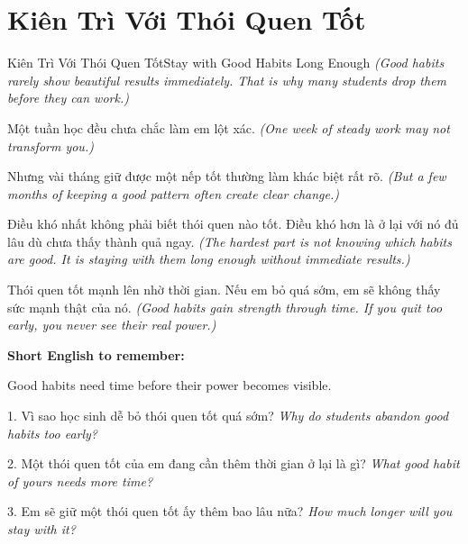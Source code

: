 \section{Kiên Trì Với Thói Quen Tốt}
\begin{truyen}{Kiên Trì Với Thói Quen Tốt}{Stay with Good Habits Long Enough}
\textit{(Good habits rarely show beautiful results immediately. That is why many students drop them before they can work.)}

Một tuần học đều chưa chắc làm em lột xác.
\textit{(One week of steady work may not transform you.)}

Nhưng vài tháng giữ được một nếp tốt thường làm khác biệt rất rõ.
\textit{(But a few months of keeping a good pattern often create clear change.)}

Điều khó nhất không phải biết thói quen nào tốt. Điều khó hơn là ở lại với nó đủ lâu dù chưa thấy thành quả ngay.
\textit{(The hardest part is not knowing which habits are good. It is staying with them long enough without immediate results.)}
\end{truyen}

\begin{baihoc}
Thói quen tốt mạnh lên nhờ thời gian. Nếu em bỏ quá sớm, em sẽ không thấy sức mạnh thật của nó.
\textit{(Good habits gain strength through time. If you quit too early, you never see their real power.)}
\end{baihoc}

\begin{ghinhoanh}
\textbf{Short English to remember:}

Good habits need time before their power becomes visible.

\end{ghinhoanh}

\begin{tuhocnhanh}
1. Vì sao học sinh dễ bỏ thói quen tốt quá sớm? \textit{Why do students abandon good habits too early?}

2. Một thói quen tốt của em đang cần thêm thời gian ở lại là gì? \textit{What good habit of yours needs more time?}

3. Em sẽ giữ một thói quen tốt ấy thêm bao lâu nữa? \textit{How much longer will you stay with it?}
\end{tuhocnhanh}
\ngancach
